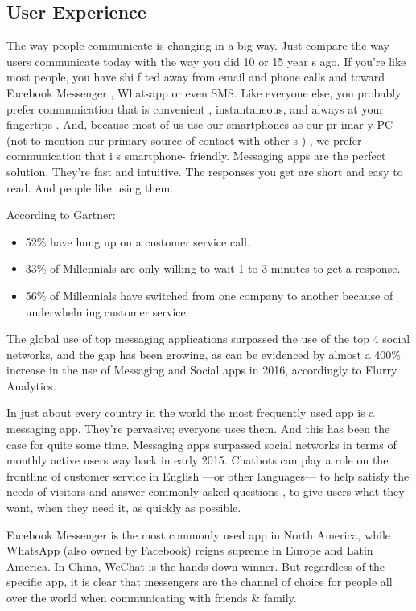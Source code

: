 \documentclass[	DIV=calc,%
							paper=letter,%
							fontsize=12pt%
                            ]{scrartcl}	 					%
\begin{document}
\subsection{\label{sec:level2}User Experience}

The way people communicate is changing in a big way. Just compare the way users communicate today with the way you did 10 or 15 year s ago. If you’re like most people, you have shi f ted away from email and phone calls and toward Facebook Messenger , Whatsapp or even SMS. Like everyone else, you probably prefer communication that is convenient , instantaneous, and always at your fingertips . And, because most of us use our smartphones as our pr imar y PC (not to mention our primary source of contact with other s ) , we prefer communication that i s smartphone- friendly. Messaging apps are the perfect solution. They’re fast and intuitive. The responses you get are short and easy to read. And people like using them.

According to Gartner:
\begin{itemize}
\item 52\% have hung up on a customer service call. 
\item 33\% of Millennials are only willing to wait 1 to 3 minutes to get a response. 
\item 56\% of Millennials have switched from one company to another because of underwhelming customer service.
\end{itemize}


The global use of top messaging applications surpassed the use of the top 4 social networks, and the gap has been growing, as can be evidenced by almost a 400\% increase in the use of Messaging and Social apps in 2016, accordingly to Flurry Analytics.

In just about every country in the world the most frequently used app is a messaging app. They’re pervasive; everyone uses them. And this has been the case for quite some time. Messaging apps surpassed social networks in terms of monthly active users way back in early 2015.
Chatbots can play a role on the frontline of customer service in English —or other languages— to help satisfy the needs of visitors and answer commonly asked questions , to give users what they want, when they need it, as quickly as possible. 

Facebook Messenger is the most commonly used app in North America, while WhatsApp (also owned by Facebook) reigns supreme in Europe and Latin America. In China, WeChat is the hands-down winner. But regardless of the specific app, it is clear that messengers are the channel of choice for people all over the world when communicating with friends \& family.
\end{document}
